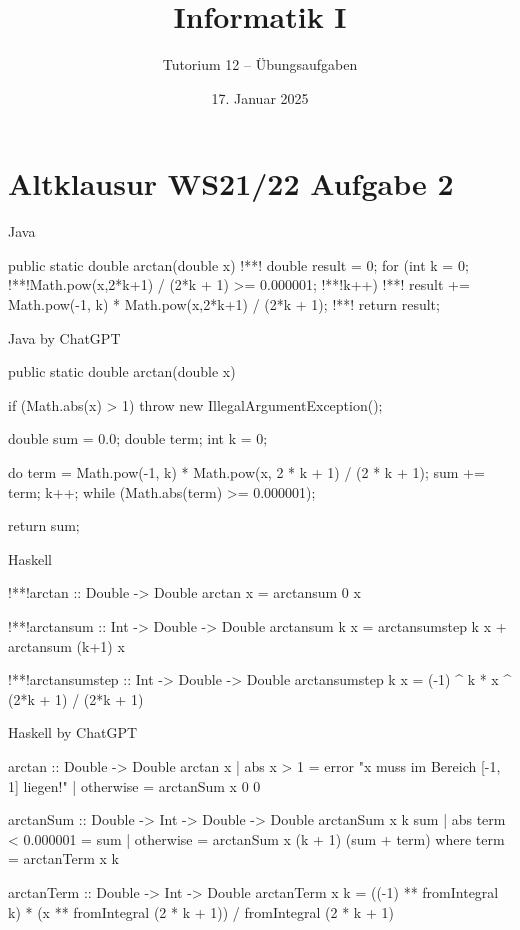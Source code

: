 \documentclass[aspectratio=169,usepdftitle=true,11pt,ngerman,t]{beamer}
\subtitle{Tutorium 12 -- Übungsaufgaben}
\date{17. Januar 2025}
\title{Informatik I}
\author{\lqfullname}
\begin{document}

\section{Altklausur WS21/22 Aufgabe 2}

\begin{frame}[fragile]{Java}\onslide<+->
    \begin{plainjava}
public static double arctan(double x) {
!*\onslide<+->*!	double result = 0;
	for (int k = 0; !*\onslide<+->*!Math.pow(x,2*k+1) / (2*k + 1) >= 0.000001; !*\onslide<+->*!k++) {
!*\onslide<+->*!		result += Math.pow(-1, k) * Math.pow(x,2*k+1) / (2*k + 1);
	}
!*\onslide<+->*!	return result;
}
    \end{plainjava}
\end{frame}

\begin{frame}[fragile]{Java by ChatGPT}
    \begin{plainjava}
public static double arctan(double x) {
    if (Math.abs(x) > 1) throw new IllegalArgumentException();

    double sum = 0.0;
    double term;
    int k = 0;

    do {
        term = Math.pow(-1, k) * Math.pow(x, 2 * k + 1) / (2 * k + 1);
        sum += term;
        k++;
    } while (Math.abs(term) >= 0.000001);

    return sum;
}
    \end{plainjava}
\end{frame}

\begin{frame}[fragile]{Haskell}\onslide<+->
    \begin{plainhaskell}
!*\onslide<+->*!arctan :: Double -> Double
arctan x = arctansum 0 x

!*\onslide<+->*!arctansum :: Int -> Double -> Double
arctansum k x = arctansumstep k x + arctansum (k+1) x

!*\onslide<+->*!arctansumstep :: Int -> Double -> Double
arctansumstep k x = (-1) ^ k * x ^ (2*k + 1) / (2*k + 1)
    \end{plainhaskell}
\end{frame}

\begin{frame}[fragile]{Haskell by ChatGPT}
    \begin{plainhaskell}
arctan :: Double -> Double
arctan x
  | abs x > 1 = error "x muss im Bereich [-1, 1] liegen!"
  | otherwise = arctanSum x 0 0

arctanSum :: Double -> Int -> Double -> Double
arctanSum x k sum
  | abs term < 0.000001 = sum
  | otherwise = arctanSum x (k + 1) (sum + term)
  where
    term = arctanTerm x k

arctanTerm :: Double -> Int -> Double
arctanTerm x k = ((-1) ** fromIntegral k) * (x ** fromIntegral (2 * k + 1)) / fromIntegral (2 * k + 1)
    \end{plainhaskell}
\end{frame}
\end{document}
